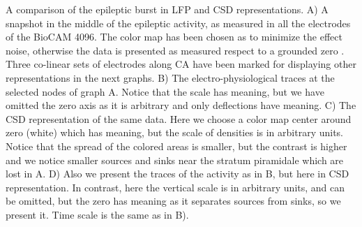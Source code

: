\documentclass[letterpaper, 12pt]{article}
\begin{document}
A comparison of the epileptic burst in LFP and CSD representations.
A) A snapshot in the middle of the epileptic activity, as measured in
all the electrodes of the BioCAM 4096. The color map has been chosen as to
minimize the effect noise, otherwise the data is presented as measured respect
to a grounded zero . Three co-linear sets  of electrodes along CA have been
marked for displaying other representations in the next graphs.
B) The electro-physiological traces at the selected nodes of graph A.
Notice that the scale has meaning, but we have omitted the zero axis as it
is arbitrary and only deflections have meaning.
C) The CSD representation of the same data. Here we choose a color map
center around zero (white) which has meaning, but the scale of densities is
in arbitrary units. Notice that the spread of the colored areas is smaller, but
the contrast is higher and we notice smaller  sources and sinks near
the stratum piramidale which are lost in A.
D) Also we present the traces of the activity as in B, but here in CSD
representation. In contrast, here the vertical scale is in arbitrary units,
and can be omitted, but the zero has meaning as it separates
sources from sinks, so we present it. Time scale is the same as in B). 
\end{document}
